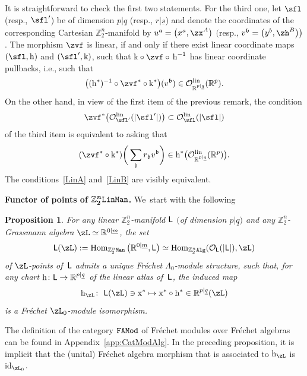 \documentclass[pdftex]{sigma}%
\newcommand{\rmh}{\textnormal{h}}
\newcommand{\rmk}{\textnormal{k}}
\newcommand{\op}[1]{\operatorname{#1}}
\newcommand{\R}{{\mathbb R}}
\newcommand{\Z}{{\mathbb Z}}
\def\ul{\underline}
\def\cO{\mathcal{O}}
\def\ul{\underline}
\newcommand{\0}{\otimes}
\newcommand{\id}{\op{id}}
\newcommand{\z}{\Z_2^n}
\numberwithin{equation}{section}
\newtheorem{Proposition}[Theorem]{Proposition}
 { \theoremstyle{definition}
\newtheorem{Definition}[Theorem]{Definition}
\newtheorem{Example}[Theorem]{Example}
\newtheorem{Remark}[Theorem]{Remark} }
\begin{document}
It is straightforward to check the first two statements. For the third one, let $\sfl$ (resp., $\sfl'$) be of dimension $p|\ul q$ (resp., $r|\ul s$) and denote the coordinates of the corresponding Cartesian $\z$-manifold by $u^{\mathfrak a}=\big(x^a,\zx^A\big)$ $\big($resp., $v^{\mathfrak b}=\big(y^b,\zh^B\big)\big)$. The morphism $\zvf$ is linear, if and only if there exist linear coordinate maps $(\sfl,\rmh)$ and $(\sfl',\rmk)$, such that $\rmk\circ\zvf\circ\,\rmh^{-1}$ has linear coordinate pullbacks, i.e., such that
\begin{gather}\label{LinA}
\big((\rmh^*)^{-1}\circ\zvf^*\circ\rmk^*\big)(v^{\mathfrak b})\in\cO^{\op{lin}}_{\R^{p|\ul q}}(\R^p).
\end{gather}
On the other hand, in view of the first item of the previous remark, the condition
\[
\zvf^*\big(\cO^{\op{lin}}_{\sfl'}(|\sfl'|)\big)\subset\cO^{\op{lin}}_{\sfl}(|\sfl|)
\]
of the third item is equivalent to asking that
\begin{gather}\label{LinB}
(\zvf^*\circ\rmk^*)\bigg(\sum_{\mathfrak{b}}r_{\mathfrak{b}}v^{\mathfrak{b}}\bigg)\in \rmh^*\big(\cO^{\op{lin}}_{\R^{p|\ul q}}(\R^p)\big).
\end{gather}
The conditions~\eqref{LinA} and~\eqref{LinB} are visibly equivalent.

\medskip\noindent
{\bf Functor of points of $\boldsymbol{\z{\tt LinMan}}$.} We~start with the following

\begin{Proposition}\label{FL0Mod}
For any linear $\z$-manifold $\sf{L}$ $($of dimension $p|\ul q)$ and any $\z$-Grassmann algebra $\zL\simeq \R^{0|\underline{m}}$, the set
\[
{\sf{L}}(\zL):=\op{Hom}_{\z {\tt Man}}\big(\R^{0|\underline{m}},{\sf L}\big)\simeq \op{Hom}_{\z\tt Alg}(\cO_{\sf L}(|{\sf L}|),\zL)
\]
of $\zL$-points of $\,\sf L$ admits a unique Fr\'echet $\Lambda_0$-module structure, such that, for any chart ${\rm h}\colon {\sf L}\to \R^{p|\ul q}$ of the linear atlas of $\,\sf{L}$, the induced map
\[
{\rm h}_\zL\colon\ {\sf{L}}(\zL)\ni {\rm x}^*\mapsto {\rm x}^*\circ{\rm h}^*\in\R^{p|\ul q}(\zL)
\]
is a Fr\'echet $\zL_0$-module isomorphism.
\end{Proposition}
%
The definition of the category $\tt FAMod$ of Fr\'echet modules over Fr\'echet algebras can be found in Appendix~\ref{app:CatModAlg}. In the preceding proposition, it is implicit that the (unital) Fr\'echet algebra morphism that is associated to ${\rm h}_\zL$ is $\id_{\zL_0}$.
\end{document}
